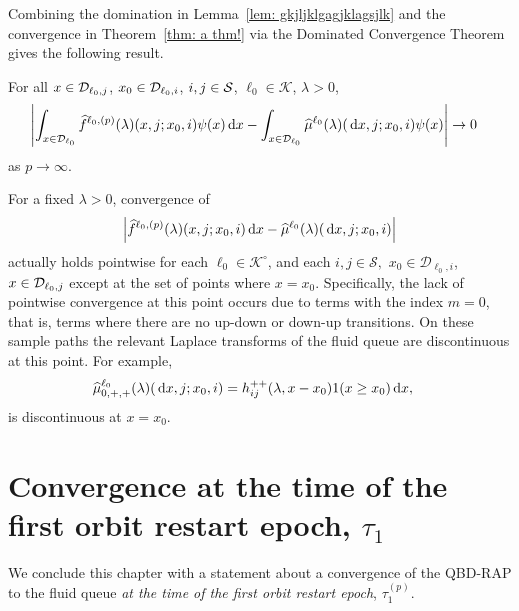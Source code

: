 Combining the domination in Lemma~\ref{lem: gkjljklgagjklagsjlk} and the convergence in Theorem~\ref{thm: a thm!} via the Dominated Convergence Theorem gives the following result. 
\begin{lem} \label{lem:vn4}
	For all \(x\in\mathcal{D}_{\ell_0,j}\), \(x_0\in\mathcal{D}_{\ell_0,i}\), \(i,j\in\mathcal{S}\), \(\ell_0\in\mathcal K\), \(\lambda > 0\),  
	\begin{align}
		&\left|\int_{x\in\mathcal{D}_{\ell_0}}\widehat f^{\ell_0,(p)}(\lambda)(x,j;x_0,i)\psi(x) \, \mathrm{d} x - \int_{x\in\mathcal{D}_{\ell_0}}\widehat \mu^{\ell_0}(\lambda)(\, \mathrm{d} x,j; x_0,i)\psi(x) \right|\to 0  \label{eqn: akhv}
	\end{align}
	as \(p\to\infty\). 
\end{lem}
	 
\begin{rem}\label{rem: point wies}
	For a fixed \(\lambda > 0\), convergence of 
	\begin{align}
		\left|\widehat f^{\ell_0,(p)}(\lambda)(x,j;x_0,i)\, \mathrm{d} x - \widehat \mu^{\ell_0}(\lambda)( \, \mathrm{d} x,j; x_0,i) \right|
	\end{align}
	actually holds pointwise for each \(\ell_0\in\mathcal K^\circ\), and each \(i,j\in\mathcal S,\) \(x_0\in\mathcal D_{\ell_0,i}\), \(x\in\mathcal{D}_{\ell_0,j}\) except at the set of points where \(x=x_0\). Specifically, the lack of pointwise convergence at this point occurs due to terms with the index \(m=0\), that is, terms where there are no up-down or down-up transitions. On these sample paths the relevant Laplace transforms of the fluid queue are discontinuous at this point. For example, 
	\begin{align*}
		\widehat \mu^{\ell_0}_{0,+,+}(\lambda)(\, \mathrm{d} x,j;x_0,i) &= h_{ij}^{++}(\lambda,x-x_0)1(x\geq x_0)\, \mathrm{d} x,
	\end{align*}
	is discontinuous at \(x=x_0\). 
\end{rem}

\section{Convergence at the time of the first orbit restart epoch, \(\tau_1\)}\label{sec: 1st change}
We conclude this chapter with a statement about a convergence of the QBD-RAP to the fluid queue \emph{at the time of the first orbit restart epoch}, \(\tau_1^{(p)}\). 

